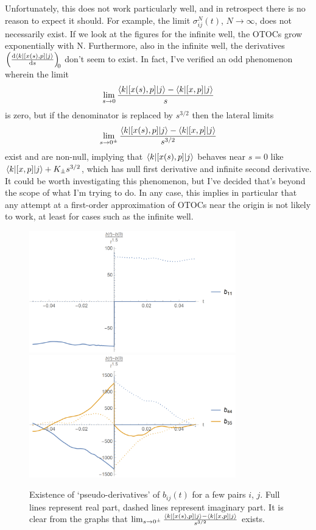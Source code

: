 \documentclass{article}
\begin{document}
Unfortunately, this does not work particularly well, and in retrospect there is no reason to expect it should. For example, the limit $\sigma_{ij}^N(t)$, $N \to \infty$, does not necessarily exist. If we look at the figures for the infinite well, the OTOCs grow exponentially with N. Furthermore, also in the infinite well, the derivatives $\diff{\braket{k|[x(s), p]|j}}s[0]$ don't seem to exist. In fact, I've verified an odd phenomenon wherein the limit
\begin{equation}
\lim_{s \to 0} \frac{\braket{k|[x(s), p]|j} - \braket{k|[x, p]|j}}{s}
\end{equation}
is zero, but if the denominator is replaced by $s^{3/2}$ then the lateral limits
\begin{equation}
\lim_{s \to 0^\pm} \frac{\braket{k|[x(s), p]|j} - \braket{k|[x, p]|j}}{s^{3/2}}
\end{equation}
exist and are non-null, implying that $\braket{k|[x(s), p]|j}$ behaves near $s=0$ like $\braket{k|[x, p]|j} + K_\pm s^{3/2}$, which has null first derivative and infinite second derivative. It could be worth investigating this phenomenon, but I've decided that's beyond the scope of what I'm trying to do. In any case, this implies in particular that any attempt at a first-order approximation of OTOCs near the origin is not likely to work, at least for cases such as the infinite well.

\begin{figure}
\centering
\includegraphics[width=0.8\textwidth]{pseudoderivativeb11}
\includegraphics[width=0.8\textwidth]{pseudoderivativeb4435}
\caption{Existence of `pseudo-derivatives' of $b_{ij}(t)$ for a few pairs $i$, $j$. Full lines represent real part, dashed lines represent imaginary part. It is clear from the graphs that $\lim_{s \to 0^\pm} \frac{\braket{k|[x(s), p]|j} - \braket{k|[x, p]|j}}{s^{3/2}}$ exists.}
\end{figure}
\end{document}
